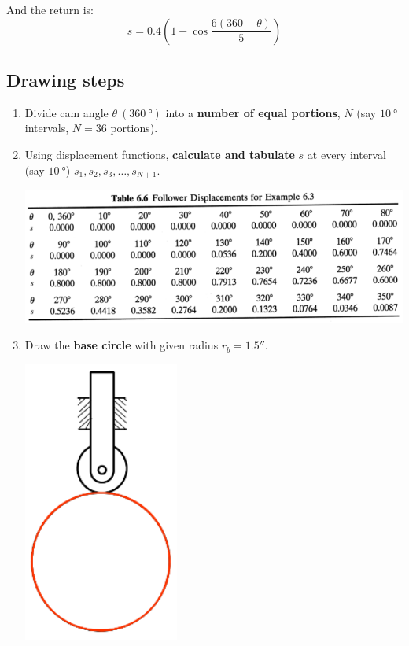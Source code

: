 \documentclass[11pt]{article}
\begin{document}
And the return is:
\[s = 0.4 \left(1 - \cos \frac{6 (360 - \theta)}{5} \right)\]

 \newpage
\subsection{Drawing steps}
\label{sec:org51ab00e}
\begin{enumerate}
\item Divide cam angle \(\theta \ (\qty{360}{\degree})\) into a \textbf{number of equal portions}, \(N\) (say \(\qty{10}{\degree}\) intervals, \(N = 36\) portions).
\item Using displacement functions, \textbf{calculate and tabulate} \(s\) at every interval (say \(\qty{10}{\degree}\)) \(s_1, s_2, s_3, \ldots, s_{N + 1}\).
\begin{center}
\includegraphics[width=.9\linewidth]{./images/graphical-construction-of-cam-follower-displacements.png}
\end{center}

\item Draw the \textbf{base circle} with given radius \(r_b = 1.5''\).
\begin{center}
\includegraphics[height=25em]{./images/graphical-construction-of-cam-base-circle.png}
\end{center}


\end{enumerate}
\end{document}
